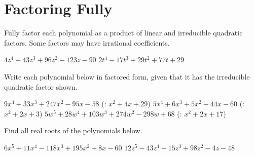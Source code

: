 \section*{Factoring Fully}
Fully factor each polynomial as a product of linear and irreducible quadratic factors. Some factors may have irrational coefficients.
\begin{smenum}
\mitemxx
{$4z^4+43z^3+96z^2-123z-90$}
{$2t^4-17t^3+29t^2+77t+29$}
\end{smenum}
Write each polynomial below in factored form, given that it has the irreducible quadratic factor shown.
\begin{smenum}
\mitemx
{$9x^4+33x^3+247x^2-95x-58$ (\iqf: $x^2+4x+29$)}
\mitemx
{$5x^4+6x^3+5x^2-44x-60$ (\iqf: $x^2+2x+3$)}
\mitemx
{$5w^5+28w^4+103w^3+274w^2-298w+68$ (\iqf: $x^2+2x+17$)}
\end{smenum}
Find all real roots of the polynomials below.
\begin{smenum}
\mitemx
{$6x^5+11x^4-118x^3+195x^2+8x-60$}
\mitemx
{$12z^5-43z^4-15z^3+98z^2-4z-48$}
\end{smenum}


